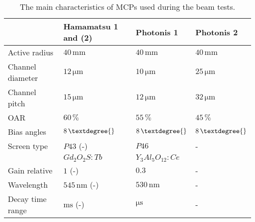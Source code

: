 \begin{table}[ht]
  \centering
  \caption[The main characteristics of MCPs used during the beam tests]{The main characteristics of MCPs used during the beam tests.}
  \label{chap4:MCP_Phosphor}
  \begin{tabular}{llll}
    \toprule
                     & Hamamatsu 1 and (2)         & Photonis 1                  & Photonis 2                  \\
    \midrule
    Active radius    & $40\,\mathrm{mm}$           & $40\,\mathrm{mm}$           & $40\,\mathrm{mm}$           \\
    Channel diameter & $12\,\mathrm{\mu m}$        & $10\,\mathrm{\mu m}$        & $25\,\mathrm{\mu m}$        \\
    Channel pitch    & $15\,\mathrm{\mu m}$        & $12\,\mathrm{\mu m}$        & $32\,\mathrm{\mu m}$        \\
    OAR              & $60\,\mathrm{\%}$           & $55\,\mathrm{\%}$           & $45\,\mathrm{\%}$           \\
    Bias angles      & $8\,\mathrm{\textdegree{}}$ & $8\,\mathrm{\textdegree{}}$ & $8\,\mathrm{\textdegree{}}$ \\
    \midrule
    Screen type      & $P43$ (-)                   & $P46$                       & -                           \\
                     & $Gd_{2}O_{2}S:Tb$           & $Y_{3}Al_{5}O_{12}:Ce$      &                             \\
    Gain relative    & $1$ (-)                     & $0.3$                       & -                           \\
    Wavelength       & $545\,\mathrm{nm}$ (-)      & $530\,\mathrm{nm}$          & -                           \\
    Decay time range & $\mathrm{ms}$ (-)           & $\mathrm{\mu s}$            & -                           \\
    \bottomrule
  \end{tabular}
\end{table}